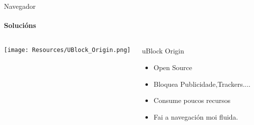 \documentclass{beamer}
\begin{document}
\begin{frame}{Navegador}
  \framesubtitle{Solucións}

  \begin{columns}
    \begin{column}{0.5\textwidth}
      \texttt{[image: Resources/UBlock\_Origin.png]}

      \vspace{1cm}


    \end{column}

    \begin{column}{0.4\textwidth}
      \begin{block}{uBlock Origin}
        \begin{itemize}
          \item Open Source
          \item Bloquea Publicidade,Trackers....
          \item Consume poucos recursos
          \item Fai a navegación moi fluida.
        \end{itemize}
      \end{block}

    \end{column}

  \end{columns}

\end{frame}

\end{document}
